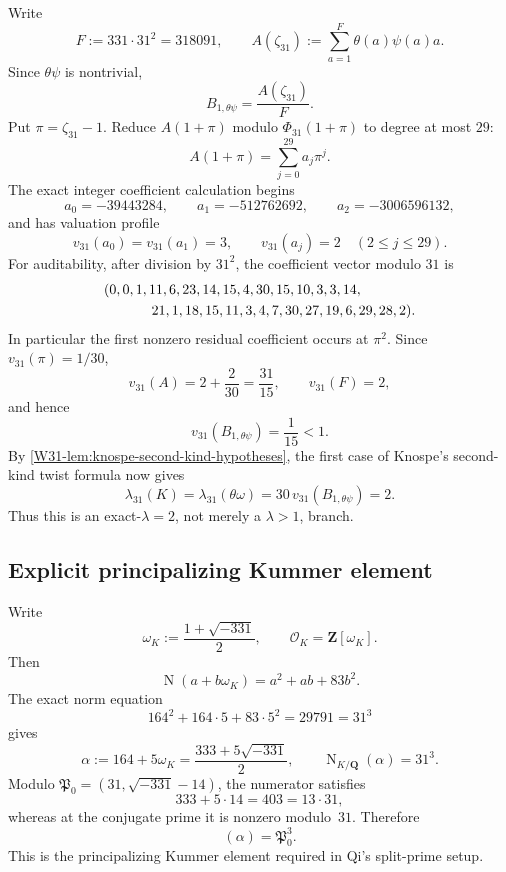 \documentclass[11pt]{article}
\theoremstyle{remark}
\begin{document}
Write
\[
 F:=331\cdot31^2=318091,
 \qquad
 A(\zeta_{31})
 :=\sum_{a=1}^{F}\theta(a)\psi(a)a.
\]
Since \(\theta\psi\) is nontrivial,
\[
 B_{1,\theta\psi}=\frac{A(\zeta_{31})}{F}.
\]
Put \(\pi=\zeta_{31}-1\).  Reduce \(A(1+\pi)\) modulo
\(\Phi_{31}(1+\pi)\) to degree at most \(29\):
\begin{equation}
 A(1+\pi)=\sum_{j=0}^{29}a_j\pi^j.
 \label{eq:v063-A-expansion}
\end{equation}
The exact integer coefficient calculation begins
\[
 a_0=-39443284,
 \qquad
 a_1=-512762692,
 \qquad
 a_2=-3006596132,
\]
and has valuation profile
\begin{equation}
 \boxed{
 v_{31}(a_0)=v_{31}(a_1)=3,
 \qquad
 v_{31}(a_j)=2\quad(2\le j\le29).
 }
 \label{eq:v063-coefficient-valuation-profile}
\end{equation}
For auditability, after division by \(31^2\), the coefficient vector modulo
\(31\) is
\begin{equation}
\begin{split}
 &(0,0,1,11,6,23,14,15,4,30,15,10,3,3,14,\\
 &\hspace{12mm}21,1,18,15,11,3,4,7,30,27,19,6,29,28,2).
\end{split}
\label{eq:v063-coefficient-vector}
\end{equation}
In particular the first nonzero residual coefficient occurs at \(\pi^2\).
Since \(v_{31}(\pi)=1/30\),
\[
 v_{31}(A)=2+\frac2{30}=\frac{31}{15},
 \qquad
 v_{31}(F)=2,
\]
and hence
\begin{equation}
 \boxed{
 v_{31}(B_{1,\theta\psi})=\frac1{15}<1.
 }
 \label{eq:v063-B1-valuation}
\end{equation}
By \cref{W31-lem:knospe-second-kind-hypotheses}, the first case of Knospe's second-kind twist formula
now gives
\begin{equation}
 \boxed{
 \lambda_{31}(K)
 =\lambda_{31}(\theta\omega)
 =30\,v_{31}(B_{1,\theta\psi})
 =2.
 }
 \label{eq:v063-lambda-exact2}
\end{equation}
Thus this is an exact-\(\lambda=2\), not merely a \(\lambda>1\), branch.

\subsection{Explicit principalizing Kummer element}

Write
\[
 \omega_K:=\frac{1+\sqrt{-331}}2,
 \qquad
 \mathcal O_K=\mathbf Z[\omega_K].
\]
Then
\[
 \operatorname N(a+b\omega_K)=a^2+ab+83b^2.
\]
The exact norm equation
\[
 164^2+164\cdot5+83\cdot5^2=29791=31^3
\]
gives
\begin{equation}
 \boxed{
 \alpha:=164+5\omega_K
 =\frac{333+5\sqrt{-331}}2,
 \qquad
 \operatorname N_{K/\mathbf Q}(\alpha)=31^3.
 }
 \label{eq:v063-alpha}
\end{equation}
Modulo \(\mathfrak P_0=(31,\sqrt{-331}-14)\), the numerator satisfies
\[
 333+5\cdot14=403=13\cdot31,
\]
whereas at the conjugate prime it is nonzero modulo~\(31\).  Therefore
\begin{equation}
 \boxed{(\alpha)=\mathfrak P_0^3.}
 \label{eq:v063-alpha-ideal}
\end{equation}
This is the principalizing Kummer element required in Qi's split-prime setup.
\end{document}
